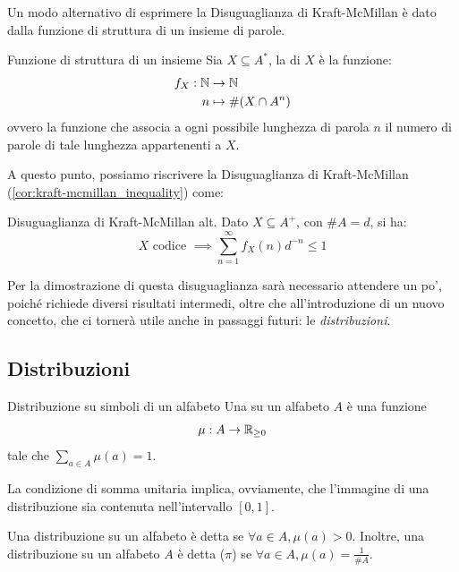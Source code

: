 Un modo alternativo di esprimere la Disuguaglianza di Kraft-McMillan è dato dalla funzione di struttura di un insieme di parole.
\begin{definition}[namedlabel={def:structure_function}{Funzione di struttura di un insieme}]{Funzione di struttura di un insieme}
  Sia \(X \subseteq A^*\), la  di \(X\) è la funzione:
  \begin{equation*}
    \begin{aligned}
      f_X: \mathbb{N} &\to \mathbb{N} \\
      n &\mapsto \#(X \cap A^n)
    \end{aligned}
  \end{equation*}
  ovvero la funzione che associa a ogni possibile lunghezza di parola \(n\) il numero di parole di tale lunghezza appartenenti a \(X\).
\end{definition}

A questo punto, possiamo riscrivere la Disuguaglianza di Kraft-McMillan (\ref{cor:kraft-mcmillan_inequality}) come:
\begin{corollary}[namedlabel={cor:kraft-mcmillan_inequality_alt}{Disuguaglianza di Kraft-McMillan alt.}]{Disuguaglianza di Kraft-McMillan alt.}
  Dato \(X \subseteq A^+\), con \(\# A = d\), si ha:
    \[X \text{ codice } \implies \sum_{n=1}^{\infty} f_X(n) d^{-n} \leq 1\]
\end{corollary}

Per la dimostrazione di questa disuguaglianza sarà necessario attendere un po', poiché richiede diversi risultati intermedi, oltre che all'introduzione di un nuovo concetto, che ci tornerà utile anche in passaggi futuri: le \emph{distribuzioni}.
\subsection{Distribuzioni}

\begin{definition}{Distribuzione su simboli di un alfabeto}
  Una  su un alfabeto \(A\) è una funzione
    \[\mu: A \to \mathbb{R}_{\geq 0}\]
  tale che \(\sum_{a \in A} \mu(a) = 1\).
\end{definition}
La condizione di somma unitaria implica, ovviamente, che l'immagine di una distribuzione sia contenuta nell'intervallo \([0,1]\).

Una distribuzione su un alfabeto è detta  se \(\forall a \in A, \mu(a) > 0\).
Inoltre, una distribuzione su un alfabeto \(A\) è detta  (\(\pi\)) se \(\forall a \in A, \mu(a) = \frac{1}{\# A}\).

